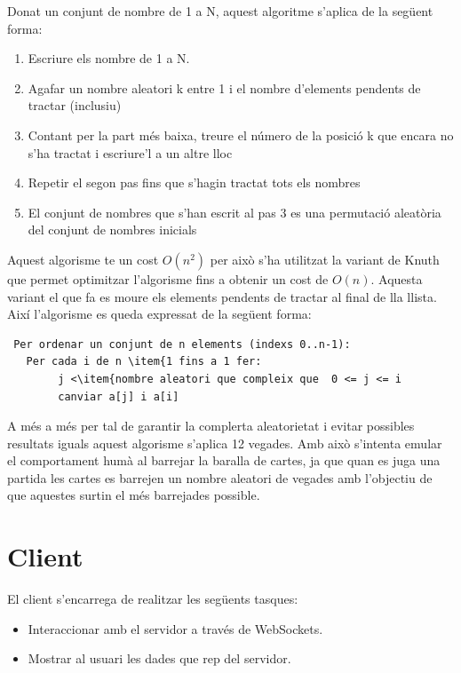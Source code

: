 Donat un conjunt de nombre de 1 a N, aquest algoritme s'aplica de la següent forma: 
\begin{enumerate}
\item{Escriure els nombre de 1 a N.}
\item{Agafar un nombre aleatori k entre 1 i el nombre d'elements pendents de tractar (inclusiu)}
\item{Contant per la part més baixa, treure el número de la posició k que encara no s'ha tractat i escriure'l a un altre lloc}
\item{Repetir el segon pas fins que s'hagin tractat tots els nombres}
\item{El conjunt de nombres que s'han escrit al pas 3 es una permutació aleatòria del conjunt de nombres inicials}
\end{enumerate}

Aquest algorisme te un cost $O(n^2)$ per això s'ha utilitzat la variant de Knuth que permet optimitzar l'algorisme fins a obtenir un cost de $O(n)$. Aquesta variant el que fa es moure els elements pendents de tractar al final de lla llista. Així l'algorisme es queda expressat de la següent forma: 

\begin{lstlisting}
 Per ordenar un conjunt de n elements (indexs 0..n-1):
   Per cada i de n \item{1 fins a 1 fer:
        j <\item{nombre aleatori que compleix que  0 <= j <= i
        canviar a[j] i a[i]
\end{lstlisting}

A més a més per tal de garantir la complerta aleatorietat i evitar possibles resultats iguals aquest algorisme s'aplica 12 vegades. Amb això s'intenta emular el comportament humà al barrejar la baralla de cartes, ja que quan es juga una partida les cartes es barrejen un nombre aleatori de vegades amb l'objectiu de que aquestes surtin el més barrejades possible. 

\section{Client}

El client s'encarrega de realitzar les següents tasques: 

\begin{itemize}
\item{Interaccionar amb el servidor a través de WebSockets.}
\item{Mostrar al usuari les dades que rep del servidor.}
\end{itemize}

